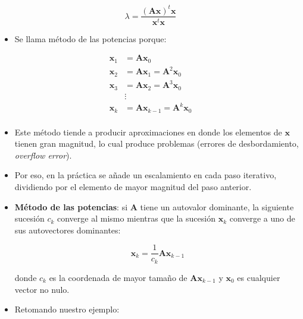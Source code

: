 \documentclass[openany]{book}
\providecommand{\tightlist}{%
  \setlength{\itemsep}{0pt}\setlength{\parskip}{0pt}}
\begin{document}
\[
\lambda = \frac{(\textbf{Ax})^t\textbf{x}}{\textbf{x}^t\textbf{x}}
\]

\begin{itemize}
\tightlist
\item
  Se llama método de las potencias porque:
\end{itemize}

\[
\begin{aligned}
\textbf{x}_1 &= \textbf{Ax}_{0} \\
\textbf{x}_2 &= \textbf{Ax}_{1} = \textbf{A}^2 \textbf{x}_{0}\\
\textbf{x}_3 &= \textbf{Ax}_{2} = \textbf{A}^3 \textbf{x}_{0}\\
&\vdots \\
\textbf{x}_k &= \textbf{Ax}_{k-1} = \textbf{A}^k \textbf{x}_{0}\\
\end{aligned}
\]

\begin{itemize}
\item
  Este método tiende a producir aproximaciones en donde los elementos de \(\textbf{x}\) tienen gran magnitud, lo cual produce problemas (errores de desbordamiento, \emph{overflow error}).
\item
  Por eso, en la práctica se añade un escalamiento en cada paso iterativo, dividiendo por el elemento de mayor magnitud del paso anterior.
\item
  \textbf{Método de las potencias}: si \(\textbf{A}\) tiene un autovalor dominante, la siguiente sucesión \(c_k\) converge al mismo mientras que la sucesión \(\textbf{x}_k\) converge a uno de sus autovectores dominantes:

  \[
    \textbf{x}_k = \frac{1}{c_k} \textbf{Ax}_{k-1}
    \]

  donde \(c_{k}\) es la coordenada de mayor tamaño de \(\textbf{Ax}_{k-1}\) y \(\textbf{x}_0\) es cualquier vector no nulo.
\item
  Retomando nuestro ejemplo:
\end{itemize}
\end{document}
